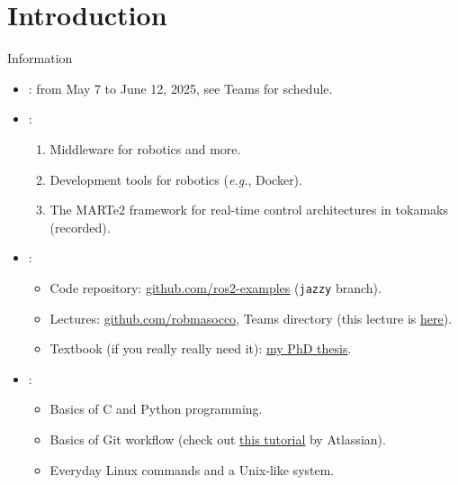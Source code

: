 
\section{Introduction}
\graphicspath{{figs/section1/}}

\begin{frame}{Information}
	\begin{itemize}
		\item {}: from May 7 to June 12, 2025, see Teams for schedule.
		\item {}:
		      \begin{enumerate}
			      \item Middleware for robotics and more.
			      \item Development tools for robotics (\emph{e.g.}, Docker).
			      \item The MARTe2 framework for real-time control architectures in tokamaks (recorded).
		      \end{enumerate}
		\item {}:
		      \begin{itemize}
			      \item Code repository: \href{https://github.com/IntelligentSystemsLabUTV/ros2-examples}{\color{blue}\underline{github.com/ros2-examples}} (\texttt{jazzy} branch).
			      \item Lectures: \href{https://github.com/stars/robmasocco/lists/lectures}{\color{blue}\underline{github.com/robmasocco}}, Teams directory (this lecture is \href{https://github.com/robmasocco/DAFN25_Robotics_1}{\color{blue}\underline{here}}).
                    \item Textbook (if you really really need it): \href{http://dx.doi.org/10.13140/RG.2.2.30948.90247}{\color{blue}\underline{my PhD thesis}}.
		      \end{itemize}
		\item {}:
		      \begin{itemize}
			      \item Basics of C and Python programming.
			      \item Basics of Git workflow (check out \href{https://www.atlassian.com/git/tutorials/what-is-git}{\color{blue}\underline{this tutorial}} by Atlassian).
			      \item Everyday Linux commands and a Unix-like system.
		      \end{itemize}
	\end{itemize}
\end{frame}

